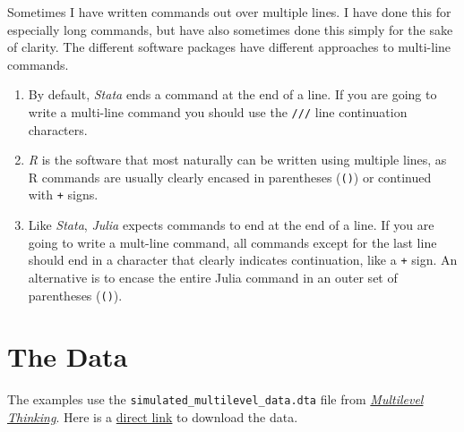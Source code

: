 \documentclass[
  letterpaper,
  DIV=11,
  numbers=noendperiod]{scrreprt}
\providecommand{\tightlist}{%
  \setlength{\itemsep}{0pt}\setlength{\parskip}{0pt}}\usepackage{longtable,booktabs,array}
\begin{document}
\begin{tcolorbox}[enhanced jigsaw, opacityback=0, arc=.35mm, coltitle=black, colframe=quarto-callout-tip-color-frame, toptitle=1mm, colbacktitle=quarto-callout-tip-color!10!white, toprule=.15mm, colback=white, left=2mm, bottomtitle=1mm, bottomrule=.15mm, title=\textcolor{quarto-callout-tip-color}{\faLightbulb}\hspace{0.5em}{Multi-Line Commands}, rightrule=.15mm, opacitybacktitle=0.6, titlerule=0mm, leftrule=.75mm, breakable]

Sometimes I have written commands out over multiple lines. I have done
this for especially long commands, but have also sometimes done this
simply for the sake of clarity. The different software packages have
different approaches to multi-line commands.

\begin{enumerate}
\def\labelenumi{\arabic{enumi}.}
\tightlist
\item
  By default, \emph{Stata} ends a command at the end of a line. If you
  are going to write a multi-line command you should use the
  \texttt{///} line continuation characters.
\item
  \emph{R} is the software that most naturally can be written using
  multiple lines, as R commands are usually clearly encased in
  parentheses (\texttt{()}) or continued with \texttt{+} signs.
\item
  Like \emph{Stata}, \emph{Julia} expects commands to end at the end of
  a line. If you are going to write a mult-line command, all commands
  except for the last line should end in a character that clearly
  indicates continuation, like a \texttt{+} sign. An alternative is to
  encase the entire Julia command in an outer set of parentheses
  (\texttt{()}).
\end{enumerate}

\end{tcolorbox}

\section{The Data}\label{sec-data}

The examples use the \texttt{simulated\_multilevel\_data.dta} file from
\href{https://agrogan1.github.io/multilevel-thinking/simulated-multi-country-data.html}{\emph{Multilevel
Thinking}}. Here is a
\href{https://github.com/agrogan1/multilevel-multilingual/raw/main/simulated_multilevel_data.dta}{direct
link} to download the data.
\end{document}
